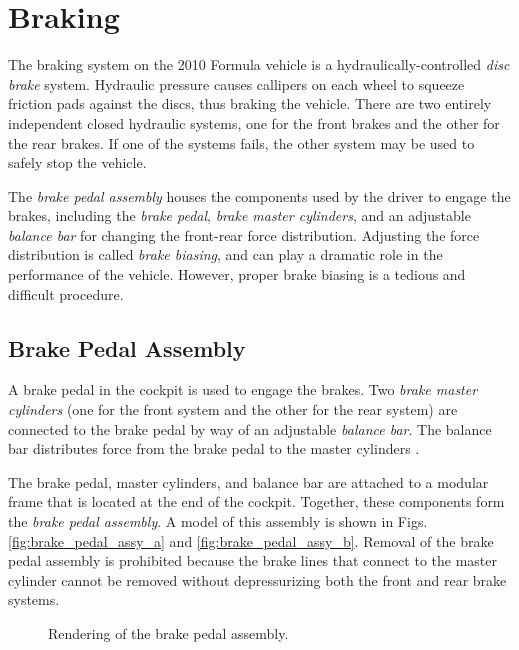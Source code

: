 \section{Braking}

The braking system on the 2010 Formula vehicle is a hydraulically-controlled \emph{disc brake} system. Hydraulic pressure causes callipers on each wheel to squeeze friction pads against the discs, thus braking the vehicle. There are two entirely independent closed hydraulic systems, one for the front brakes and the other for the rear brakes. If one of the systems fails, the other system may be used to safely stop the vehicle. 

The \emph{brake pedal assembly} houses the components used by the driver to engage the brakes, including the \emph{brake pedal}, \emph{brake master cylinders}, and an adjustable \emph{balance bar} for changing the front-rear force distribution. Adjusting the force distribution is called \emph{brake biasing}, and can play a dramatic role in the performance of the vehicle. However, proper brake biasing is a tedious and difficult procedure.

\subsection{Brake Pedal Assembly}

A brake pedal in the cockpit is used to engage the brakes. Two \emph{brake master cylinders} (one for the front system and the other for the rear system) are connected to the brake pedal by way of an adjustable \emph{balance bar}. The balance bar distributes force from the brake pedal to the master cylinders \cite{TiltonBrakeBias}. 

The brake pedal, master cylinders, and balance bar are attached to a modular frame that is located at the end of the cockpit. Together, these components form the \emph{brake pedal assembly}. A model of this assembly is shown in Figs. \ref{fig:brake_pedal_assy_a} and \ref{fig:brake_pedal_assy_b}. Removal of the brake pedal assembly is prohibited because the brake lines that connect to the master cylinder cannot be removed without depressurizing both the front and rear brake systems. 

\begin{figure}[h!]
	\centering
    \caption{Rendering of the brake pedal assembly.}
    \label{fig:brake_pedal_assy}
\end{figure}

